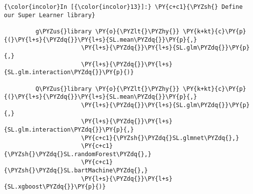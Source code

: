 
    \begin{Verbatim}[commandchars=\\\{\}]
{\color{incolor}In [{\color{incolor}13}]:} \PY{c+c1}{\PYZsh{} Define our Super Learner library}
         
         g\PYZus{}library \PY{o}{\PYZlt{}\PYZhy{}} \PY{k+kt}{c}\PY{p}{(}\PY{l+s}{\PYZdq{}}\PY{l+s}{SL.mean\PYZdq{}}\PY{p}{,}
                      \PY{l+s}{\PYZdq{}}\PY{l+s}{SL.glm\PYZdq{}}\PY{p}{,}
                      \PY{l+s}{\PYZdq{}}\PY{l+s}{SL.glm.interaction\PYZdq{}}\PY{p}{)}
         
         Q\PYZus{}library \PY{o}{\PYZlt{}\PYZhy{}} \PY{k+kt}{c}\PY{p}{(}\PY{l+s}{\PYZdq{}}\PY{l+s}{SL.mean\PYZdq{}}\PY{p}{,}
                      \PY{l+s}{\PYZdq{}}\PY{l+s}{SL.glm\PYZdq{}}\PY{p}{,}
                      \PY{l+s}{\PYZdq{}}\PY{l+s}{SL.glm.interaction\PYZdq{}}\PY{p}{,}
                      \PY{c+c1}{\PYZsh{}\PYZdq{}SL.glmnet\PYZdq{},}
                      \PY{c+c1}{\PYZsh{}\PYZdq{}SL.randomForest\PYZdq{},}
                      \PY{c+c1}{\PYZsh{}\PYZdq{}SL.bartMachine\PYZdq{},}
                      \PY{l+s}{\PYZdq{}}\PY{l+s}{SL.xgboost\PYZdq{}}\PY{p}{)}
\end{Verbatim}

